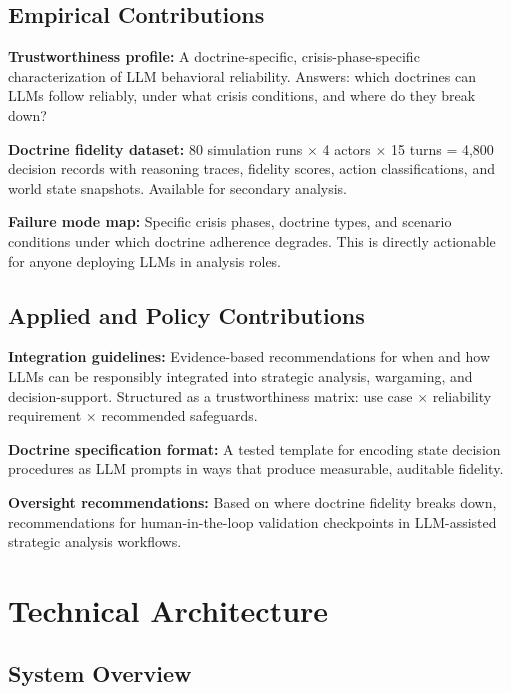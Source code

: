 \documentclass[12pt, a4paper]{article}
\begin{document}
\subsection{Empirical Contributions}

\textbf{Trustworthiness profile:} A doctrine-specific, crisis-phase-specific characterization of LLM behavioral reliability. Answers: which doctrines can LLMs follow reliably, under what crisis conditions, and where do they break down?

\textbf{Doctrine fidelity dataset:} 80 simulation runs $\times$ 4 actors $\times$ 15 turns = 4,800 decision records with reasoning traces, fidelity scores, action classifications, and world state snapshots. Available for secondary analysis.

\textbf{Failure mode map:} Specific crisis phases, doctrine types, and scenario conditions under which doctrine adherence degrades. This is directly actionable for anyone deploying LLMs in analysis roles.

\subsection{Applied and Policy Contributions}

\textbf{Integration guidelines:} Evidence-based recommendations for when and how LLMs can be responsibly integrated into strategic analysis, wargaming, and decision-support. Structured as a trustworthiness matrix: use case $\times$ reliability requirement $\times$ recommended safeguards.

\textbf{Doctrine specification format:} A tested template for encoding state decision procedures as LLM prompts in ways that produce measurable, auditable fidelity.

\textbf{Oversight recommendations:} Based on where doctrine fidelity breaks down, recommendations for human-in-the-loop validation checkpoints in LLM-assisted strategic analysis workflows.

\section{Technical Architecture}

\subsection{System Overview}
\end{document}
